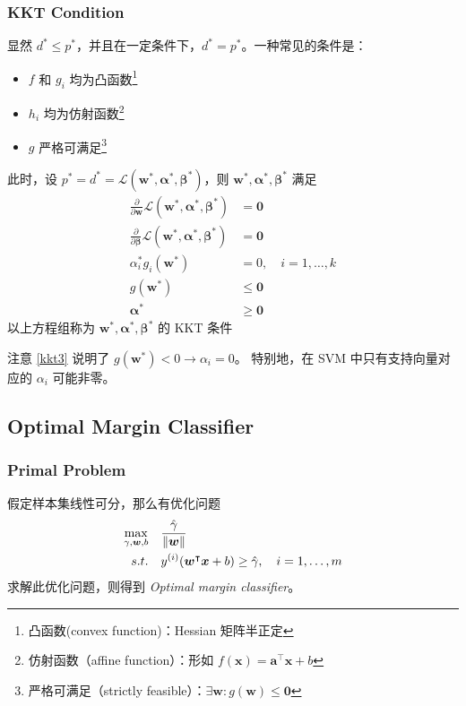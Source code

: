 	\subsubsection{KKT Condition}\label{sec-kkt}
	显然 $ d^* \leq p^* $，并且在一定条件下，$ d^* = p^* $。一种常见的条件是：
	\begin{itemize}
		\item $ f $ 和 $ g_i $ 均为凸函数\footnote{凸函数(convex function)：Hessian 矩阵半正定}
		\item $ h_i $ 均为仿射函数\footnote{仿射函数（affine function）：形如 $ f(\bm{x}) = \bm{a}^\intercal \bm{x} + b $}
		\item $ g $ 严格可满足\footnote{严格可满足（strictly feasible）：$ \exists \bm{w}: g(\bm{w}) \leq \bm{0} $}
	\end{itemize}
	
	此时，设 $ p^* = d^* = \mathcal{L}(\bm{w}^*, \bm{\alpha}^*, \bm{\beta}^*) $，则 $ \bm{w}^*, \bm{\alpha}^*, \bm{\beta}^* $ 满足
	\begin{align}
	\frac{\partial}{\partial \bm{w}} \mathcal{L}(\bm{w}^*, \bm{\alpha}^*, \bm{\beta}^*) &= \bm{0}\label{kkt1} \\
	\frac{\partial}{\partial \bm{\beta}} \mathcal{L}(\bm{w}^*, \bm{\alpha}^*, \bm{\beta}^*) &= \bm{0} \\
	\alpha_i^* g_i(\bm{w}^*) &=0, \quad i = 1,\ldots,k \label{kkt3}\\
	g(\bm{w}^*) & \leq \bm{0} \\
	\bm{\alpha}^* & \geq \bm{0}
	\end{align}
	以上方程组称为 $ \bm{w}^*, \bm{\alpha}^*, \bm{\beta}^* $ 的 KKT 条件
	
	注意 \eqref{kkt3} 说明了 $ g(\bm{w}^*) < 0 \to \alpha_i = 0 $。
	特别地，在 SVM 中只有支持向量对应的 $ \alpha_i $ 可能非零。
	
	\subsection{Optimal Margin Classifier}
		\subsubsection{Primal Problem}
		假定样本集线性可分，那么有优化问题
		\begin{align*}
			\max_{\gamma, \bm{w}, b}\quad & \frac{\hat{\gamma}}{\| \bm{w} \|} \\
			s.t. \quad & y^{(i)} (\bm{w^}\intercal \bm{x} + b) \geq \hat{\gamma}, \quad i = 1, \ldots, m
		\end{align*}
		求解此优化问题，则得到 \emph{Optimal margin classifier}。
		
